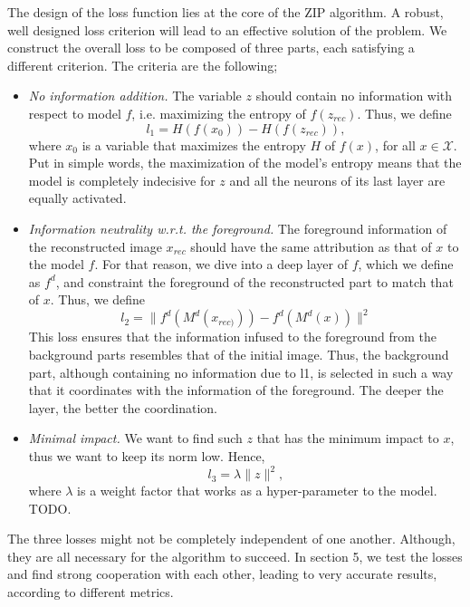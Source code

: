 The design of the loss function lies at the core of the ZIP algorithm. A robust, well designed loss criterion will lead to an effective solution of the problem. We construct the overall loss to be composed of three parts, each satisfying a different criterion. The criteria are the following;
\begin{itemize}
	\item \emph{No information addition.} The variable $z$ should contain no information with respect to model $f$, i.e. maximizing the entropy of $f(z_{rec})$. Thus, we define 
	\begin{equation}
		l_1 = H(f(x_0))-H(f(z_{rec})),
	\end{equation}
	where $x_0$ is a variable that maximizes the entropy $H$ of $f(x)$, for all $x \in \mathcal{X}$. Put in simple words, the maximization of the model's entropy means that the model is completely indecisive for $z$ and all the neurons of its last layer are equally activated.  
	\item \emph{Information neutrality w.r.t. the foreground.} The foreground information of the reconstructed image $x_{rec}$ should have the same attribution as that of $x$ to the model $f$. For that reason, we dive into a deep layer of $f$, which we define as $f^d$, and constraint the foreground of the reconstructed part to match that of $x$. Thus, we define
	\begin{equation}
		l_2 = \|f^d(M^d(x_{rec)})) - f^d(M^d(x))\|^2
	\end{equation}
	This loss ensures that the information infused to the foreground from the background parts resembles that of the initial image. Thus, the background part, although containing no information due to l1, is selected in such a way that it coordinates with the information of the foreground. The deeper the layer, the better the coordination.
	\item \emph{Minimal impact.} We want to find such $z$ that has the minimum impact to $x$, thus we want to keep its norm low. Hence, 
	\begin{equation}
		l_3 = \lambda \|z\|^2,
	\end{equation}
	where $\lambda$ is a weight factor that works as a hyper-parameter to the model. TODO. 
\end{itemize}
The three losses might not be completely independent of one another. Although, they are all necessary for the algorithm to succeed. In section 5, we test the losses and find strong cooperation with each other, leading to very accurate results, according to different metrics. 